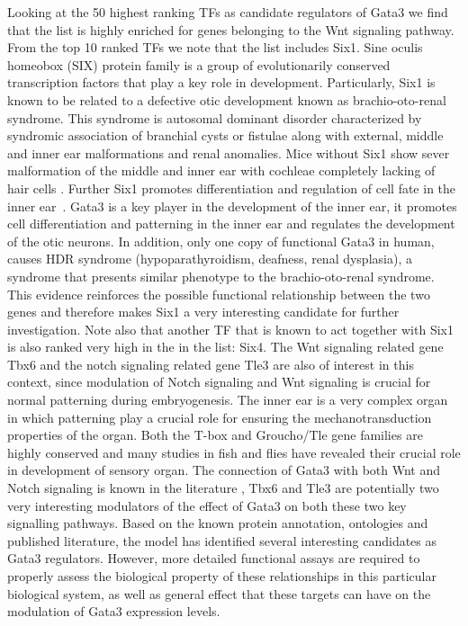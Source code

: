 \documentclass{article}
\begin{document}
Looking at the 50 highest ranking TFs as candidate regulators of Gata3
we find  that the list is  highly enriched for genes  belonging to the
Wnt signaling  pathway.  From the top  10 ranked TFs we  note that the
list includes  Six1. Sine  oculis homeobox (SIX)  protein family  is a
group of  evolutionarily conserved  transcription factors that  play a
key role in development. Particularly,  Six1 is known to be related to
a  defective  otic development  known  as brachio-oto-renal  syndrome.
This  syndrome   is  autosomal  dominant   disorder  characterized  by
syndromic  association  of  branchial  cysts or  fistulae  along  with
external, middle and inner ear malformations and renal anomalies. Mice
without Six1 show sever malformation  of the middle and inner ear with
cochleae completely  lacking of hair  cells \cite{Bosman2009}. Further
Six1 promotes differentiation and regulation of cell fate in the inner
ear~\cite{Fritzsch2007,Bosman2009}.  Gata3  is  a  key player  in  the
development  of the inner  ear, it  promotes cell  differentiation and
patterning in the inner ear  and regulates the development of the otic
neurons.  In addition,  only one  copy of  functional Gata3  in human,
causes HDR syndrome (hypoparathyroidism, deafness, renal dysplasia), a
syndrome  that  presents similar  phenotype  to the  brachio-oto-renal
syndrome.   This   evidence   reinforces   the   possible   functional
relationship between  the two  genes and therefore  makes Six1  a very
interesting  candidate  for  further  investigation.  Note  also  that
another TF that is known to act together with Six1 is also ranked very
high in the in the list: Six4. The Wnt signaling related gene Tbx6 and
the notch  signaling related  gene Tle3 are  also of interest  in this
context,  since modulation  of Notch  signaling and  Wnt  signaling is
crucial for normal patterning during embryogenesis. The inner ear is a
very  complex  organ in  which  patterning  play  a crucial  role  for
ensuring  the mechanotransduction  properties of  the organ.  Both the
T-box  and Groucho/Tle  gene families  are highly  conserved  and many
studies  in  fish  and  flies  have revealed  their  crucial  role  in
development of  sensory organ. The  connection of Gata3 with  both Wnt
and     Notch    signaling    is     known    in     the    literature
\cite{Rivolta2002,Kelly2009}, Tbx6  and Tle3 are  potentially two very
interesting modulators  of the effect of  Gata3 on both  these two key
signalling pathways. Based on the known protein annotation, ontologies
and published literature, the model has identified several interesting
candidates  as  Gata3 regulators.  However,  more detailed  functional
assays  are required  to properly  assess the  biological  property of
these relationships  in this particular biological system,  as well as
general effect that these targets  can have on the modulation of Gata3
expression levels.
\end{document}
